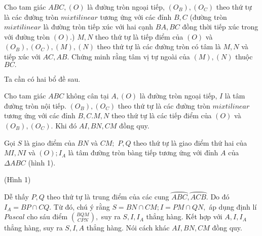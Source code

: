 \begin{bt}%
	Cho tam giác $ABC, (O)$ là đường tròn ngoại tiếp, $(O_B), (O_C)$ theo thứ tự là các đường tròn $mixtilinear$ tương ứng với các đỉnh $B, C$ (đường tròn $mixtilinear$ là đường tròn tiếp xúc với  hai cạnh $BA, BC$ đồng thời tiếp xúc trong với đường tròn $(O).$) $ M, N$ theo thứ tự là tiếp điểm của $(O)$ và $(O_B), (O_C), (M),(N)$ theo thứ tự là các đường tròn có tâm là $M,N$ và tiếp xúc với $AC, AB.$ Chứng minh rằng tâm vị tự ngoài của $(M), (N)$ thuộc $BC.$
	\loigiai
	{Ta cần có hai bổ đề sau.
		\begin{bode}[1]
			Cho tam giác $ABC$ không cân tại $A, (O)$ là đường tròn ngoại tiếp, $I$ là tâm đường tròn nội tiếp. $(O_B), (O_C)$ theo thứ tự là các đường tròn $mixtilinear$ tương ứng với các đỉnh $B,C. M, N$ theo thứ tự là các tiếp điểm của $(O)$ và $(O_B), (O_C).$ Khi đó $AI, BN, CM$ đồng quy.
		\end{bode}
		\begin{cm}
			Gọi $S$ là giao điểm của $BN$ và $CM;$ $P, Q$ theo thứ tự là giao điểm thứ hai của $MI, NI$ và $(O); I_A$ là tâm đường tròn bàng tiếp tương ứng với đỉnh $A$ của  $\Delta ABC$ (hình 1).
			\begin{center}
				\allowdisplaybreaks
				\newline
				(Hình 1)
			\end{center}				
			Dễ thấy $P, Q$ theo thứ tự là trung điểm của  các cung $\wideparen{ABC},\wideparen{ACB}.$ Do đó $I_A=BP \cap CQ.$ 			
			Từ đó, chú ý rằng $S=BN\cap CM; I=PM\cap QN,$ áp dụng định lí $Pascal$ cho sáu điểm $\displaystyle\binom{BQM}{CPN},$ suy ra $S, I, I_A$ thẳng hàng. Kết hợp với $A, I, I_A$ thẳng hàng, suy ra $S, I, A$ thẳng hàng. Nói cách khác $AI, BN, CM$ đồng quy.

\end{cm}}
\end{bt}
